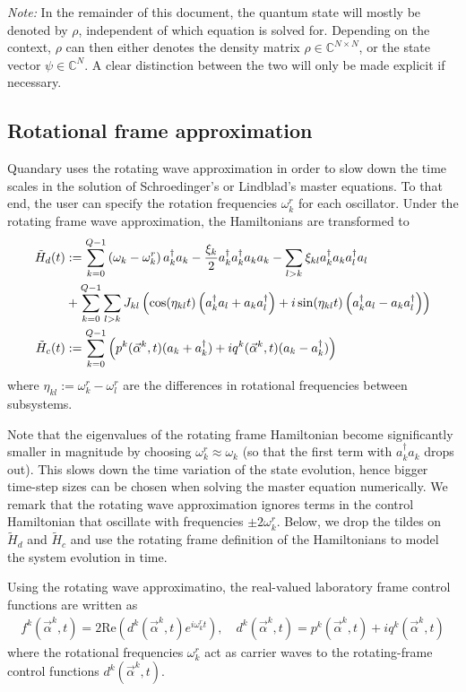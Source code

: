 \documentclass[11pt]{article}
\newcommand{\C}{\mathds{C}}
\begin{document}
\textit{Note:} In the remainder of this document, the quantum state will mostly be denoted by $\rho$, independent of which equation is solved for. Depending on the context, $\rho$ can then either denotes the density matrix $\rho\in \C^{N\times N}$, or the state vector $\psi\in \C^N$. A clear distinction between the two will only be made explicit if necessary.

\subsection{Rotational frame approximation}
Quandary uses the rotating wave approximation in order to slow down the time scales in the solution of Schroedinger's or Lindblad's master equations. To that end, the user can specify the rotation frequencies $\omega_k^r$ for each oscillator. Under the rotating frame wave approximation, the Hamiltonians are transformed to 
\begin{align} 
  \tilde H_d(t) &:= \sum_{k=0}^{Q-1} \left(\omega_k - \omega_k^{r}\right)a_k^{\dagger}a_k- \frac{\xi_k}{2}
  a_k^{\dagger}a_k^{\dagger}a_k a_k  
   - \sum_{l> k} \xi_{kl} a_{k}^{\dagger}a_{k}   a_{l}^{\dagger} a_{l} \notag \\
   & + \sum_{k=0}^{Q-1}\sum_{l>k} J_{kl} \left(\cos(\eta_{kl}t) \left(a_k^\dagger a_l + a_k a_l^\dagger\right) + i\sin(\eta_{kl}t)\left(a_k^\dagger a_l - a_k a_l^\dagger\right) \right) \label{eq:Hd_rotating} \\
   \tilde H_c(t) &:= \sum_{k=0}^{Q-1} \left( p^k(\vec{\alpha}^k,t) (a_k +
   a_k^{\dagger}) + i q^k(\vec{\alpha}^k,t)(a_k - a_k^{\dagger})
   \right)  \label{eq:Hc_rotating}
\end{align} 
where $\eta_{kl} := \omega_k^{r} - \omega_l^{r}$ are the differences in rotational frequencies between subsystems. 

Note that the eigenvalues of the rotating frame Hamiltonian become significantly smaller in magnitude by choosing $\omega_k^r \approx \omega_k$ (so that the first term with $a_k^\dagger a_k$ drops out). This slows down the time variation of the state evolution, hence bigger time-step sizes can be chosen when solving the master equation numerically. We remark that the rotating wave approximation ignores terms in the control Hamiltonian that oscillate with frequencies $\pm 2\omega_k^r$. Below, we drop the tildes on $\tilde H_d$ and $\tilde H_c$ and use the rotating frame definition of the Hamiltonians to model the system evolution in time. 

Using the rotating wave approximatino, the real-valued laboratory frame control functions are written as 
\begin{align}
  f^k(\vec{\alpha}^k,t) = 2\mbox{Re}\left(d^k(\vec{\alpha}^k,t)e^{i\omega_k^r t}\right), \quad d^k(\vec{\alpha}^k,t) = p^k(\vec{\alpha}^k,t) + i q^k(\vec{\alpha}^k,t)
\end{align}
where the rotational frequencies $\omega_k^r$ act as carrier waves to the rotating-frame control functions $d^k(\vec{\alpha}^k, t)$. 
\end{document}
